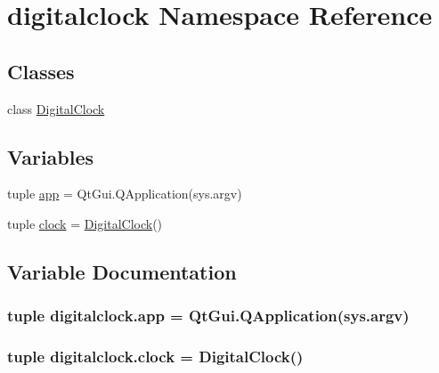 \hypertarget{namespacedigitalclock}{}\section{digitalclock Namespace Reference}
\label{namespacedigitalclock}
\subsection*{Classes}
\begin{DoxyCompactItemize}
\item 
class \hyperlink{classdigitalclock_1_1DigitalClock}{Digital\+Clock}
\end{DoxyCompactItemize}
\subsection*{Variables}
\begin{DoxyCompactItemize}
\item 
tuple \hyperlink{namespacedigitalclock_ab176d1f15823be236f321636a3c7ea1e}{app} = Qt\+Gui.\+Q\+Application(sys.\+argv)
\item 
tuple \hyperlink{namespacedigitalclock_acef0b7a37f677f98efdb3728af3ad12b}{clock} = \hyperlink{classdigitalclock_1_1DigitalClock}{Digital\+Clock}()
\end{DoxyCompactItemize}


\subsection{Variable Documentation}
\hypertarget{namespacedigitalclock_ab176d1f15823be236f321636a3c7ea1e}{}
\subsubsection[{app}]{\setlength{\rightskip}{0pt plus 5cm}tuple digitalclock.\+app = Qt\+Gui.\+Q\+Application(sys.\+argv)}\label{namespacedigitalclock_ab176d1f15823be236f321636a3c7ea1e}
\hypertarget{namespacedigitalclock_acef0b7a37f677f98efdb3728af3ad12b}{}
\subsubsection[{clock}]{\setlength{\rightskip}{0pt plus 5cm}tuple digitalclock.\+clock = {\bf Digital\+Clock}()}\label{namespacedigitalclock_acef0b7a37f677f98efdb3728af3ad12b}
